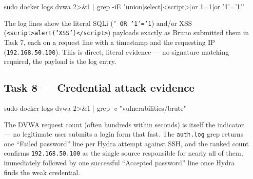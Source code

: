 \documentclass[11pt,a4paper]{article}
\begin{document}
\begin{cmdbox}
\begin{cmdverb}
sudo docker logs dvwa 2>&1 | grep -iE "union|select|<script>|or 1=1|or '1'='1'"
\end{cmdverb}
\end{cmdbox}

\begin{expectbox}
The log lines show the literal SQLi (\texttt{' OR '1'='1}) and/or XSS
(\texttt{<script>alert('XSS')</script>}) payloads exactly as Bruno submitted them in
Task 7, each on a request line with a timestamp and the requesting IP
(\texttt{192.168.50.100}). This is direct, literal evidence --- no signature matching
required, the payload is the log entry.
\end{expectbox}

\subsection{Task 8 --- Credential attack evidence}
\begin{cmdbox}
\begin{cmdverb}
sudo docker logs dvwa 2>&1 | grep -c "vulnerabilities/brute"
\end{cmdverb}
\end{cmdbox}

\begin{cmdbox}
\end{cmdbox}

\begin{expectbox}
The DVWA request count (often hundreds within seconds) is itself the indicator --- no
legitimate user submits a login form that fast. The \texttt{auth.log} grep returns one
``Failed password'' line per Hydra attempt against SSH, and the ranked count confirms
\texttt{192.168.50.100} as the single source responsible for nearly all of them,
immediately followed by one successful ``Accepted password'' line once Hydra finds the
weak credential.
\end{expectbox}
\end{document}
